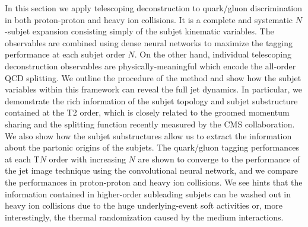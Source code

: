\documentclass[notoc]{JHEP3}
\begin{document}
In this section we apply telescoping deconstruction to quark/gluon discrimination \cite{Chien:2017decon} in both proton-proton and heavy ion collisions. It is a complete and systematic $N$-subjet expansion consisting simply of the subjet kinematic variables. The observables are combined using dense neural networks to maximize the tagging performance at each subjet order $N$. On the other hand, individual telescoping deconstruction observables are physically-meaningful which encode the all-order QCD splitting. We outline the procedure of the method and show how the subjet variables within this framework can reveal the full jet dynamics. In particular, we demonstrate the rich information of the subjet topology and subjet substructure contained at the T2 order, which is closely related to the groomed momentum sharing and the splitting function recently measured by the CMS collaboration. We also show how the subjet substructures allow us to extract the information about the partonic origins of the subjets. The quark/gluon tagging performances at each T$N$ order with increasing $N$ are shown to converge to the performance of the jet image technique using the convolutional neural network, and we compare the performances in proton-proton and heavy ion collisions. We see hints that the information contained in higher-order subleading subjets can be washed out in heavy ion collisions due to the huge underlying-event soft activities or, more interestingly, the thermal randomization caused by the medium interactions.
\end{document}
